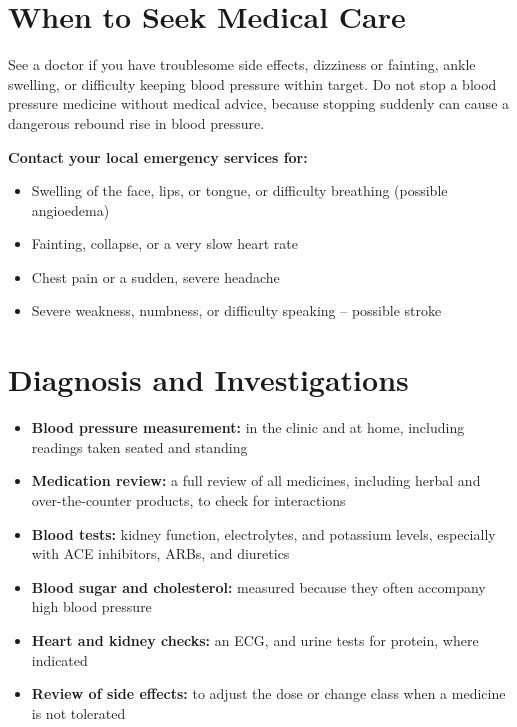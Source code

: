 \section*{When to Seek Medical Care}
See a doctor if you have troublesome side effects, dizziness or fainting, ankle swelling, or difficulty keeping blood pressure within target. Do not stop a blood pressure medicine without medical advice, because stopping suddenly can cause a dangerous rebound rise in blood pressure.

\textbf{Contact your local emergency services for:}
\begin{itemize}
    \item Swelling of the face, lips, or tongue, or difficulty breathing (possible angioedema)
    \item Fainting, collapse, or a very slow heart rate
    \item Chest pain or a sudden, severe headache
    \item Severe weakness, numbness, or difficulty speaking -- possible stroke
\end{itemize}

\section*{Diagnosis and Investigations}
\begin{itemize}
    \item \textbf{Blood pressure measurement:} in the clinic and at home, including readings taken seated and standing
    \item \textbf{Medication review:} a full review of all medicines, including herbal and over-the-counter products, to check for interactions
    \item \textbf{Blood tests:} kidney function, electrolytes, and potassium levels, especially with ACE inhibitors, ARBs, and diuretics
    \item \textbf{Blood sugar and cholesterol:} measured because they often accompany high blood pressure
    \item \textbf{Heart and kidney checks:} an ECG, and urine tests for protein, where indicated
    \item \textbf{Review of side effects:} to adjust the dose or change class when a medicine is not tolerated
\end{itemize}

